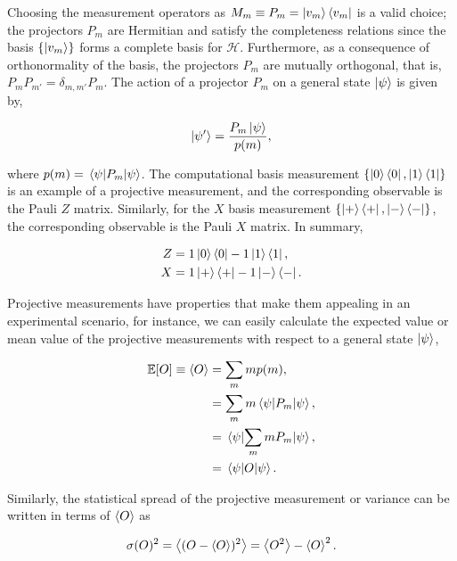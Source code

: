 \clearpage
\noindent
Choosing the measurement operators as $M_m \equiv P_m = \ket{v_m}\bra{v_m}$ is a valid choice; the projectors $P_m$ are Hermitian and satisfy the completeness relations since the basis $\{\ket{v_m}\}$ forms a complete basis for $\mathcal{H}$. Furthermore, as a consequence of orthonormality of the basis, the projectors $P_m$ are mutually orthogonal, that is, $P_mP_{m'} = \delta_{m,m'} P_m$. The action of a projector $P_m$ on a general state $\ket{\psi}$ is given by, 

\begin{align}
	\ket{\psi'} = \frac{P_m\ket{\psi}}{p(m)},
\end{align}

\noindent
where $p(m) = \expval{P_m}{\psi}$. The computational basis measurement $\{\ket{0}\bra{0},\ket{1}\bra{1}\}$ is an example of a projective measurement, and the corresponding observable is the Pauli $Z$ matrix. Similarly, for the $X$ basis measurement $\{\ket{+}\bra{+}, \ket{-}\bra{-}\}$, the corresponding observable is the Pauli $X$ matrix. In summary,

\begin{align}
	Z &= 1 \ket{0}\bra{0} - 1 \ket{1}\bra{1}, \\
	X &= 1 \ket{+}\bra{+} - 1 \ket{-}\bra{-}.
\end{align}

\bigskip
\noindent
Projective measurements have properties that make them appealing in an experimental scenario, for instance, we can easily calculate the expected value or mean value of the projective measurements with respect to a general state $\ket{\psi}$,

\begin{align}
	\mathbb{E}[O] \equiv \expval{O} &= \displaystyle\sum_{m} m p(m), \nonumber \\
	&= \displaystyle\sum_{m} m \expval{P_m}{\psi}, \nonumber \\
	&= \expval{\displaystyle\sum_m m P_m}{\psi}, \nonumber \\
	&= \expval{O}{\psi}.
\end{align}

\noindent
Similarly, the statistical spread of the projective measurement or variance can be written in terms of $\expval{O}$ as

\begin{align}
	\sigma(O)^2 = \expval{(O - \expval{O})^2} = \expval{O^2} - \expval{O}^2.
\end{align}

